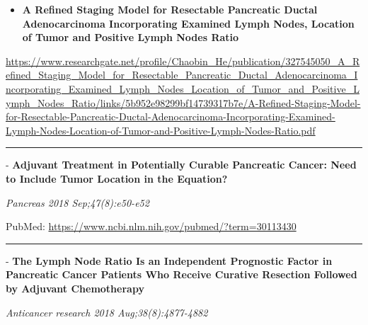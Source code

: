 \documentclass[]{article}
\providecommand{\tightlist}{%
  \setlength{\itemsep}{0pt}\setlength{\parskip}{0pt}}
\begin{document}
\begin{itemize}
\tightlist
\item
  \textbf{A Refined Staging Model for Resectable Pancreatic Ductal
  Adenocarcinoma Incorporating Examined Lymph Nodes, Location of Tumor
  and Positive Lymph Nodes Ratio}
\end{itemize}

\url{https://www.researchgate.net/profile/Chaobin_He/publication/327545050_A_Refined_Staging_Model_for_Resectable_Pancreatic_Ductal_Adenocarcinoma_Incorporating_Examined_Lymph_Nodes_Location_of_Tumor_and_Positive_Lymph_Nodes_Ratio/links/5b952e98299bf14739317b7e/A-Refined-Staging-Model-for-Resectable-Pancreatic-Ductal-Adenocarcinoma-Incorporating-Examined-Lymph-Nodes-Location-of-Tumor-and-Positive-Lymph-Nodes-Ratio.pdf}

\begin{center}\rule{0.5\linewidth}{\linethickness}\end{center}

 - \textbf{Adjuvant Treatment in Potentially Curable Pancreatic Cancer:
Need to Include Tumor Location in the Equation?}

\emph{Pancreas 2018 Sep;47(8):e50-e52}

PubMed: \url{https://www.ncbi.nlm.nih.gov/pubmed/?term=30113430}

{}

{}

\begin{center}\rule{0.5\linewidth}{\linethickness}\end{center}

 - \textbf{The Lymph Node Ratio Is an Independent Prognostic Factor in
Pancreatic Cancer Patients Who Receive Curative Resection Followed by
Adjuvant Chemotherapy}

\emph{Anticancer research 2018 Aug;38(8):4877-4882}
\end{document}
